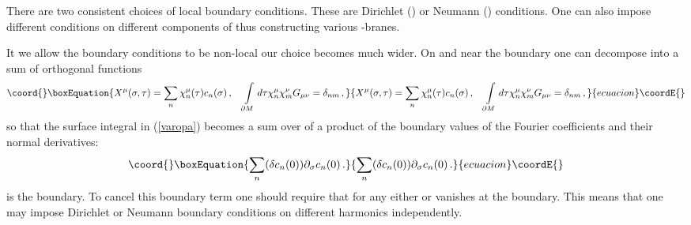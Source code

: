 \documentclass[a4paper,12pt,twoside]{article}
\begin{document}
There are two consistent choices of local boundary conditions.
These are Dirichlet (\coordHE{}) or
Neumann (\coordHE{}) conditions.
One can also impose different conditions on different components
of \coordHE{} thus constructing various \coordHE{}-branes.

It we allow the boundary conditions to be non-local our choice becomes
much wider. On and near the boundary one can decompose \coordHE{}
into a sum of orthogonal functions
\begin{equation}\coord{}\boxEquation{
X^\mu (\sigma ,\tau) =\sum\limits_n \chi^\mu_n (\tau ) c_n(\sigma )\,,
\quad
\int\limits_{\partial M} d\tau \chi^\mu_n \chi^\nu_m G_{\mu\nu} =\delta_{nm}
\,,\label{ortsum}
}{
X^\mu (\sigma ,\tau) =\sum\limits_n \chi^\mu_n (\tau ) c_n(\sigma )\,,
\quad
\int\limits_{\partial M} d\tau \chi^\mu_n \chi^\nu_m G_{\mu\nu} =\delta_{nm}
\,,}{ecuacion}\coordE{}\end{equation}
so that the surface integral in (\ref{varopa}) becomes a sum over
\coordHE{} of a product of the boundary values of the Fourier coefficients \coordHE{}
and their normal derivatives:
\begin{equation}\coord{}\boxEquation{
\sum\limits_n (\delta c_n(0)) \partial_\sigma c_n (0)\,.
\label{bsum}
}{
\sum\limits_n (\delta c_n(0)) \partial_\sigma c_n (0)\,.
}{ecuacion}\coordE{}\end{equation}
\coordHE{} is the boundary.
To cancel this boundary term one should require that 
for any \coordHE{} either \coordHE{} or \coordHE{}
vanishes at the boundary. This means that one may impose Dirichlet
or Neumann boundary conditions on different harmonics independently.
\end{document}
